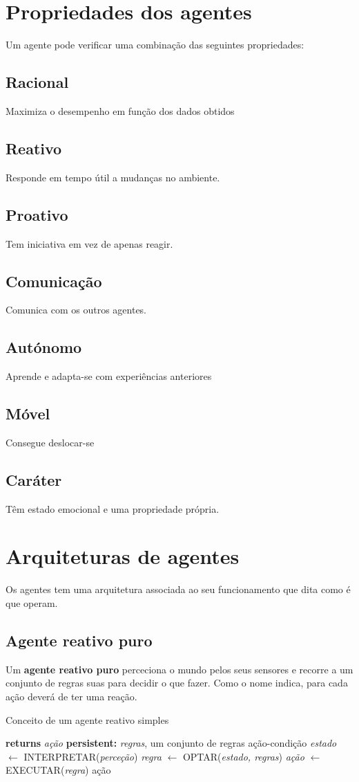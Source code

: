 \documentclass[]{report}
\begin{document}
\section{Propriedades dos agentes}
Um agente pode verificar uma combinação das seguintes propriedades:
\begin{multicols}{2}
\subsection{Racional}
Maximiza o desempenho em função dos dados obtidos
\subsection{Reativo}
Responde em tempo útil a mudanças no ambiente.
\subsection{Proativo}
Tem iniciativa em vez de apenas reagir.
\subsection{Comunicação}
Comunica com os outros agentes.
\subsection{Autónomo}
Aprende e adapta-se com experiências anteriores
\subsection{Móvel}
Consegue deslocar-se
\subsection{Caráter}
Têm estado emocional e uma propriedade própria.
\end{multicols}
\clearpage
\section{Arquiteturas de agentes}
Os agentes tem uma arquitetura associada ao seu funcionamento que dita como é que operam.
\subsection{Agente reativo puro}
Um \textbf{agente reativo puro} perceciona o mundo pelos seus sensores e recorre a um conjunto de regras suas para decidir o que fazer. Como o nome indica, para cada ação deverá de ter uma reação.
\begin{algorithm}
	\caption{Conceito de um agente reativo simples}
	\begin{algorithmic}
		 \textbf{returns} \textit{ação}
		\State \textbf{persistent:} \textit{regras}, um conjunto de regras ação-condição
		\State \textit{estado} $\gets$ INTERPRETAR(\textit{perceção})
		\State \textit{regra} $\gets$ OPTAR(\textit{estado, regras})
		\State \textit{ação} $\gets$ EXECUTAR(\textit{regra})
		\State \Return ação
		\EndFunction
	\end{algorithmic}
\end{algorithm}
\end{document}
